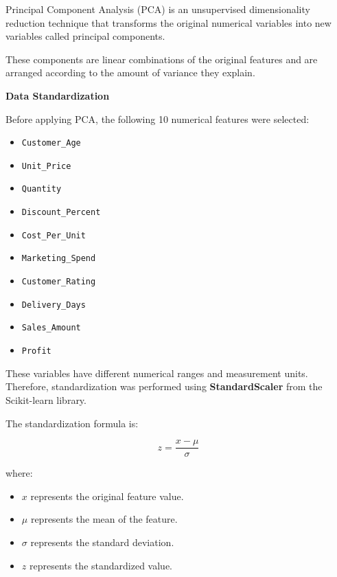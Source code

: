 \documentclass[12pt,a4paper]{report}
\begin{document}
Principal Component Analysis (PCA)
is an unsupervised dimensionality
reduction technique that transforms
the original numerical variables
into new variables called
principal components.

These components are linear
combinations of the original
features and are arranged
according to the amount of
variance they explain.

\medskip

\noindent\textbf{Data Standardization}

Before applying PCA, the following
10 numerical features were selected:

\begin{itemize}

    \item \texttt{Customer\_Age}
    \item \texttt{Unit\_Price}
    \item \texttt{Quantity}
    \item \texttt{Discount\_Percent}
    \item \texttt{Cost\_Per\_Unit}
    \item \texttt{Marketing\_Spend}
    \item \texttt{Customer\_Rating}
    \item \texttt{Delivery\_Days}
    \item \texttt{Sales\_Amount}
    \item \texttt{Profit}

\end{itemize}

These variables have different
numerical ranges and measurement
units. Therefore, standardization
was performed using
\textbf{StandardScaler} from
the Scikit-learn library.

The standardization formula is:

\[
z = \frac{x-\mu}{\sigma}
\]

where:

\begin{itemize}

    \item $x$ represents the
    original feature value.

    \item $\mu$ represents the
    mean of the feature.

    \item $\sigma$ represents the
    standard deviation.

    \item $z$ represents the
    standardized value.

\end{itemize}
\end{document}
